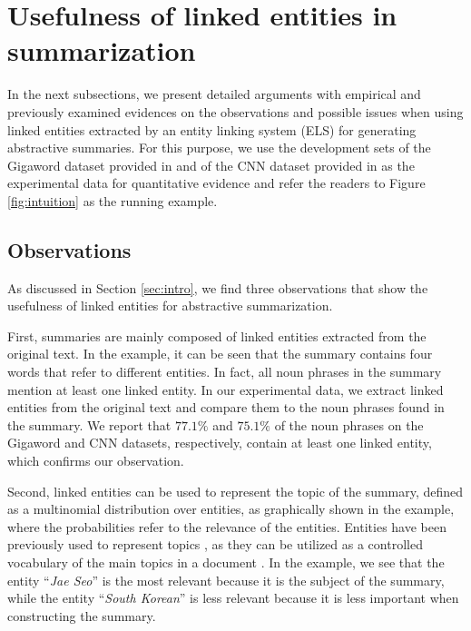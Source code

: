 \documentclass[11pt,a4paper]{article}
\begin{document}
\section{Usefulness of linked entities in summarization}
\label{sec:ent4sum}

In the next subsections, we present detailed arguments with empirical and previously examined evidences on the observations and possible issues when using linked entities extracted by an entity linking system (ELS) for generating abstractive summaries. For this purpose, we use the development sets of the Gigaword dataset provided in \cite{rush2015neural} and of the CNN dataset provided in \cite{hermann2015teaching} as the experimental data for quantitative evidence and refer the readers to Figure \ref{fig:intuition} as the running example.

\subsection{Observations}

As discussed in Section \ref{sec:intro}, we find three observations that show the usefulness of linked entities for abstractive summarization.

First, summaries are mainly composed of linked entities extracted from the original text. In the example, it can be seen that the summary contains four words that refer to different entities.
In fact, all noun phrases in the summary mention at least one linked entity. In our experimental data, we extract linked entities from the original text and compare them to the noun phrases found in the summary. We report that $77.1\%$ and $75.1\%$ of the noun phrases on the Gigaword and CNN datasets, respectively, contain at least one linked entity, which confirms our observation.

Second, linked entities can be used to represent the topic of the summary,
defined as a multinomial distribution over entities, as graphically shown in the example, where the probabilities refer to the relevance of the entities. Entities have been previously used to represent topics
\cite{newman2006analyzing}, as they can be utilized as a controlled vocabulary of the main topics in a document \cite{hulpus2013unsupervised}. 
In the example, we see that the entity ``\textit{Jae Seo}'' is the most relevant because it is the subject of the summary, while the entity ``\textit{South Korean}'' is less relevant because it is less important when constructing the summary.
\end{document}
